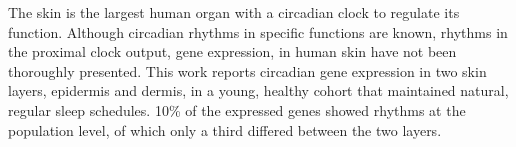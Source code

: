 The skin is the largest human organ with a circadian clock to regulate its function. Although circadian rhythms in specific functions are known, rhythms in the proximal clock output, gene expression, in human skin have not been thoroughly presented. This work reports circadian gene expression in two skin layers, epidermis and dermis, in a young, healthy cohort that maintained natural, regular sleep schedules. 10\% of the expressed genes showed rhythms at the population level, of which only a third differed between the two layers.



